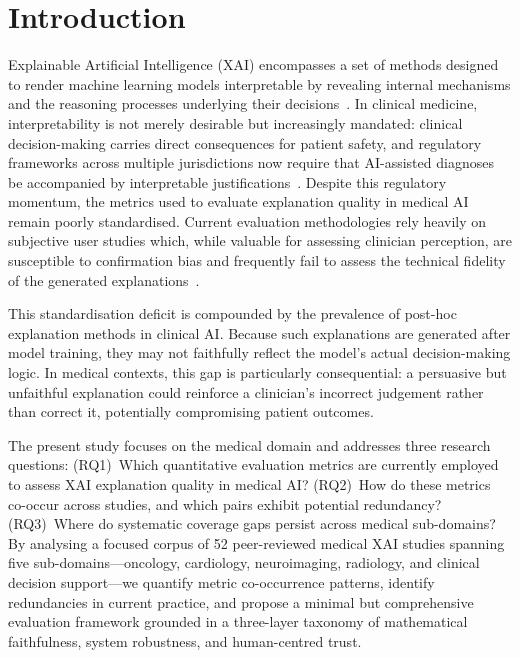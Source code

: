 \section{Introduction}

Explainable Artificial Intelligence (XAI) encompasses a set of methods designed
to render machine learning models interpretable by revealing internal
mechanisms and the reasoning processes underlying their
decisions~\cite{Arrieta2020XAI}. In clinical medicine, interpretability is not
merely desirable but increasingly mandated: clinical decision-making carries
direct consequences for patient safety, and regulatory frameworks across
multiple jurisdictions now require that AI-assisted diagnoses be accompanied by
interpretable justifications~\cite{jin2023guidelines}. Despite this regulatory
momentum, the metrics used to evaluate explanation quality in medical AI remain
poorly standardised. Current evaluation methodologies rely heavily on
subjective user studies which, while valuable for assessing clinician
perception, are susceptible to confirmation bias and frequently fail to assess
the technical fidelity of the generated
explanations~\cite{mirzaei2023xai}.

This standardisation deficit is compounded by the prevalence of post-hoc
explanation methods in clinical AI. Because such explanations are generated
after model training, they may not faithfully reflect the model's actual
decision-making logic. In medical contexts, this gap is particularly
consequential: a persuasive but unfaithful explanation could reinforce a
clinician's incorrect judgement rather than correct it, potentially
compromising patient outcomes.

The present study focuses on the medical domain and addresses three
research questions: (RQ1)~Which quantitative evaluation metrics are
currently employed to assess XAI explanation quality in medical AI?
(RQ2)~How do these metrics co-occur across studies, and which pairs
exhibit potential redundancy? (RQ3)~Where do systematic coverage gaps
persist across medical sub-domains? By analysing a focused corpus of 52
peer-reviewed medical XAI studies spanning five sub-domains---oncology,
cardiology, neuroimaging, radiology, and clinical decision
support---we quantify metric co-occurrence patterns, identify
redundancies in current practice, and propose a minimal but comprehensive
evaluation framework grounded in a three-layer taxonomy of mathematical
faithfulness, system robustness, and human-centred trust.

